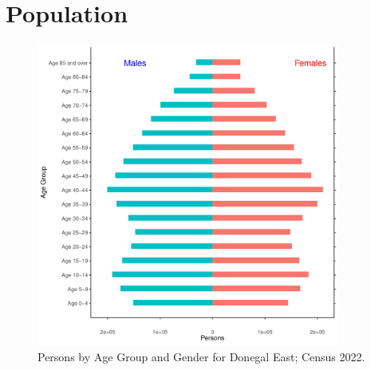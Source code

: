 \documentclass{article}
\begin{document}
\pagebreak

\section{Population} 
\label{sect:Pop}

\begin{figure}[h]
	\centering
	\includegraphics[width = 100mm]{../figures/PyramidPlot.pdf}
	\caption{Persons by Age Group and Gender for Donegal East; Census 2022.}
	\label{fig:2ae19629-1a6a-13a3-e055-000000000001}
	\end{figure}
\end{document}
